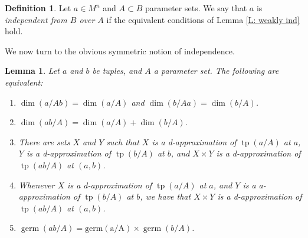 \documentclass{amsart}
\newtheorem{lemma}[theorem]{Lemma}
\theoremstyle{definition}
\newtheorem{definition}[theorem]{Definition}
\newcommand{\tp}{\operatorname{tp}}
\begin{document}
\begin{definition}
    Let $a\in M^n$ and $A\subset B$ parameter sets. We say that $a$ is \textit{independent from $B$ over $A$} if the equivalent conditions of Lemma \ref{L: weakly ind} hold.
\end{definition}

We now turn to the obvious symmetric notion of independence.

\begin{lemma}\label{L: strongly ind}
    Let $a$ and $b$ be tuples, and $A$ a parameter set. The following are equivalent:
    \begin{enumerate}
        \item $\dim(a/Ab)=\dim(a/A)$ and $\dim(b/Aa)=\dim(b/A)$.
        \item $\dim(ab/A)=\dim(a/A)+\dim(b/A)$.
         \item There are sets $X$ and $Y$ such that $X$ is a d-approximation of $\tp(a/A)$ at $a$, $Y$ is a d-approximation of $\tp(b/A)$ at $b$, and $X\times Y$ is a d-approximation of $\tp(ab/A)$ at $(a,b)$.
         \item Whenever $X$ is a d-approximation of $\tp(a/A)$ at $a$, and $Y$ is a a-approximation of $\tp(b/A)$ at $b$, we have that $X\times Y$ is a d-approximation of $\tp(ab/A)$ at $(a,b)$.
        \item $\operatorname{germ}(ab/A)=\operatorname{germ(a/A)}\times\operatorname{germ}(b/A)$.
    \end{enumerate}
\end{lemma}
\end{document}
